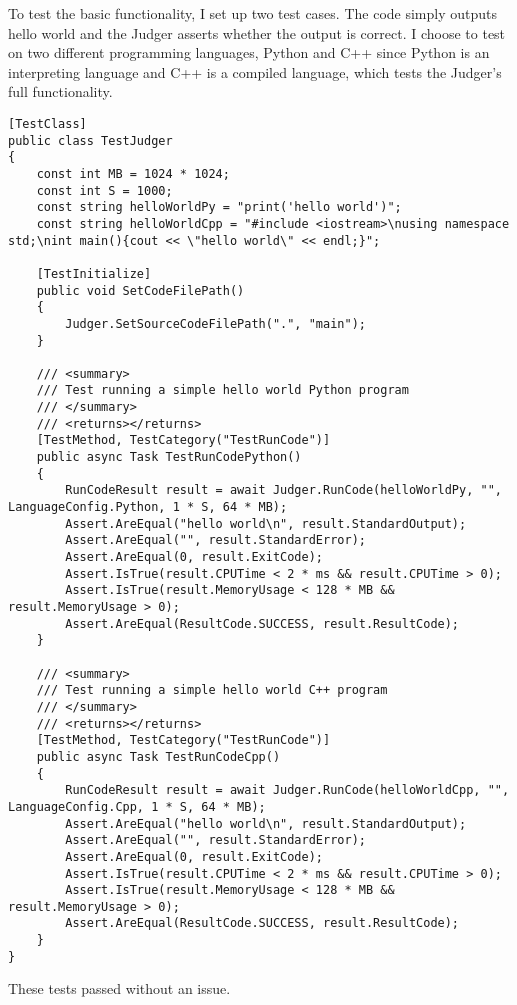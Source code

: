 \documentclass[report.tex]{subfiles}
\begin{document}
To test the basic functionality, I set up two test cases. The code simply outputs hello world and the Judger asserts whether the output is correct. I choose to test on two different programming languages, Python and C++ since Python is an interpreting language and C++ is a compiled language, which tests the Judger's full functionality.

\begin{verbatim}
[TestClass]
public class TestJudger
{
    const int MB = 1024 * 1024;
    const int S = 1000;
    const string helloWorldPy = "print('hello world')";
    const string helloWorldCpp = "#include <iostream>\nusing namespace std;\nint main(){cout << \"hello world\" << endl;}";
    
    [TestInitialize]
    public void SetCodeFilePath()
    {
        Judger.SetSourceCodeFilePath(".", "main");
    }

    /// <summary>
    /// Test running a simple hello world Python program
    /// </summary>
    /// <returns></returns>
    [TestMethod, TestCategory("TestRunCode")]
    public async Task TestRunCodePython()
    {
        RunCodeResult result = await Judger.RunCode(helloWorldPy, "", LanguageConfig.Python, 1 * S, 64 * MB);
        Assert.AreEqual("hello world\n", result.StandardOutput);
        Assert.AreEqual("", result.StandardError);
        Assert.AreEqual(0, result.ExitCode);
        Assert.IsTrue(result.CPUTime < 2 * ms && result.CPUTime > 0);
        Assert.IsTrue(result.MemoryUsage < 128 * MB && result.MemoryUsage > 0);
        Assert.AreEqual(ResultCode.SUCCESS, result.ResultCode);
    }

    /// <summary>
    /// Test running a simple hello world C++ program
    /// </summary>
    /// <returns></returns>
    [TestMethod, TestCategory("TestRunCode")]
    public async Task TestRunCodeCpp()
    {
        RunCodeResult result = await Judger.RunCode(helloWorldCpp, "", LanguageConfig.Cpp, 1 * S, 64 * MB);
        Assert.AreEqual("hello world\n", result.StandardOutput);
        Assert.AreEqual("", result.StandardError);
        Assert.AreEqual(0, result.ExitCode);
        Assert.IsTrue(result.CPUTime < 2 * ms && result.CPUTime > 0);
        Assert.IsTrue(result.MemoryUsage < 128 * MB && result.MemoryUsage > 0);
        Assert.AreEqual(ResultCode.SUCCESS, result.ResultCode);
    }
}
\end{verbatim}

These tests passed without an issue.
\end{document}
